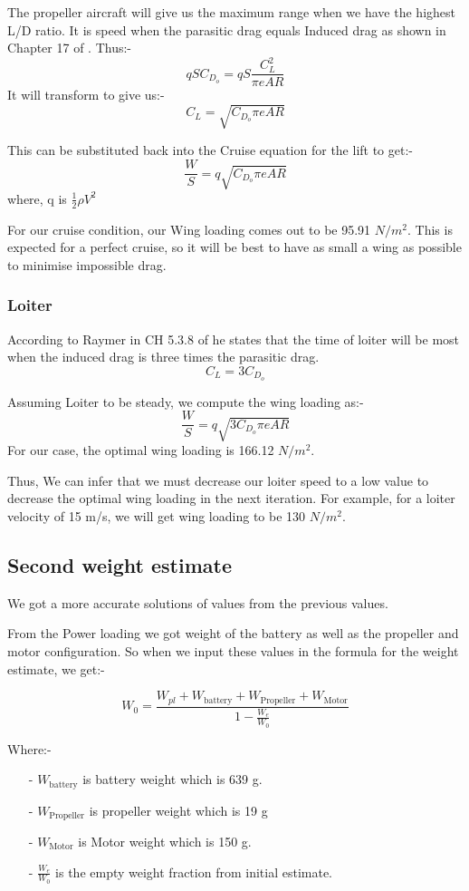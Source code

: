 \documentclass[12 pt]{article}
\begin{document}
The propeller aircraft will give us the maximum range when we have the highest L/D ratio. It is speed when the parasitic drag equals Induced drag as shown in Chapter 17 of \cite{Raymer.2006}. Thus:-
$$qSC_{D_o} = qS\frac{C_L^2}{\pi e AR}$$
It will transform to give us:- 
$$ C_L = \sqrt{C_{D_o} \pi e AR }$$

This can be substituted back into the Cruise equation for the lift to get:-
$$ \frac{W}{S} = q \sqrt{C_{D_o} \pi e AR}$$
where, q is $\frac{1}{2} \rho V^2 $

For our cruise condition, our Wing loading comes out to be 95.91 $N/m^2$. This is expected for a perfect cruise, so it will be best to have as small a wing as possible to minimise impossible drag.

\subsubsection{Loiter}

According to Raymer in CH 5.3.8 of \cite{Raymer.2006} he states that the time of loiter will be most when the induced drag is three times the parasitic drag. 
$$C_L = 3 C_{D_o}$$

Assuming Loiter to be steady, we compute the wing loading as:-
$$\frac{W}{S} = q \sqrt{3C_{D_o} \pi e AR}$$
For our case, the optimal wing loading is 166.12 $N/m^2$.

Thus, We can infer that we must decrease our loiter speed to a low value to decrease the optimal wing loading in the next iteration. For example, for a loiter velocity of 15 m/s, we will get wing loading to be 130 $N/m^2$.

\subsection{Second weight estimate}

We got a more accurate solutions of values from the previous values. 

From the Power loading we got weight of the battery as well as the propeller and motor configuration. So when we input these values in the formula for the weight estimate, we get:- 

$$W_{0} = \frac{W_{pl}  +  W_{\text{battery}}+  W_{\text{Propeller}} + W_{\text{Motor}}}{1 - \frac{W_{e}}{W_{0}}}$$

Where:-
\begin{itemize}
    \item[-] $W_{\text{battery}}$ is battery weight which is 639 g.
    \item[-] $W_{\text{Propeller}}$ is propeller weight which is 19 g
    \item[-] $W_{\text{Motor}}$ is Motor weight which is 150 g.
    \item[-] $\frac{W_{e}}{W_{0}}$ is the empty weight fraction from initial estimate.
\end{itemize}
\end{document}
